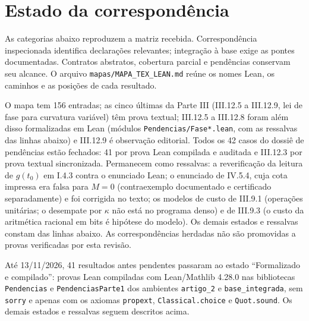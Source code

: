 \section*{Estado da correspondência}
As categorias abaixo reproduzem a matriz recebida. Correspondência inspecionada identifica declarações relevantes; integração à base exige as pontes documentadas. Contratos abstratos, cobertura parcial e pendências conservam seu alcance. O arquivo \texttt{mapas/MAPA\_TEX\_LEAN.md} reúne os nomes Lean, os caminhos e as posições de cada resultado.

O mapa tem 156 entradas; as cinco últimas da Parte III (III.12.5 a III.12.9, lei de fase para curvatura variável) têm prova textual; III.12.5 a III.12.8 foram além disso formalizadas em Lean (módulos \texttt{Pendencias/Fase*.lean}, com as ressalvas das linhas abaixo) e III.12.9 é observação editorial. Todos os 42 casos do dossiê de pendências estão fechados: 41 por prova Lean compilada e auditada e III.12.3 por prova textual sincronizada. Permanecem como ressalvas: a reverificação da leitura de $g(t_0)$ em I.4.3 contra o enunciado Lean; o enunciado de IV.5.4, cuja cota impressa era falsa para $M=0$ (contraexemplo documentado e certificado separadamente) e foi corrigida no texto; os modelos de custo de III.9.1 (operações unitárias; o desempate por $\kappa$ não está no programa denso) e de III.9.3 (o custo da aritmética racional em bits é hipótese do modelo). Os demais estados e ressalvas constam das linhas abaixo. As correspondências herdadas não são promovidas a provas verificadas por esta revisão.

Até 13/11/2026, 41 resultados antes pendentes passaram ao estado ``Formalizado e compilado'': provas Lean compiladas com Lean/Mathlib 4.28.0 nas bibliotecas \texttt{Pendencias} e \texttt{PendenciasParte1} dos ambientes \texttt{artigo\_2} e \texttt{base\_integrada}, sem \texttt{sorry} e apenas com os axiomas \texttt{propext}, \texttt{Classical.choice} e \texttt{Quot.sound}. Os demais estados e ressalvas seguem descritos acima.

